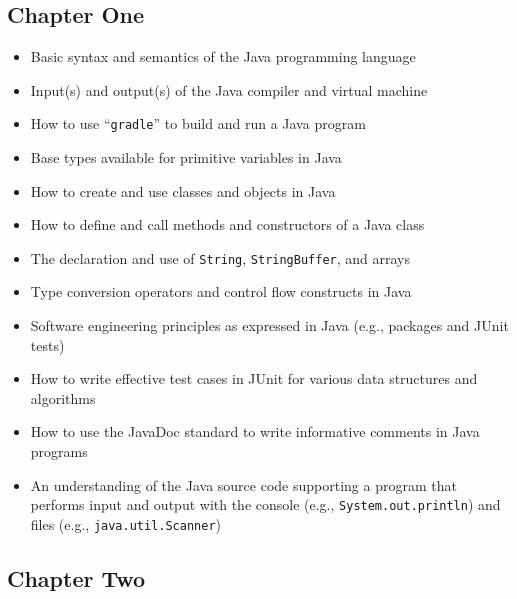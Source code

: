 \documentclass[11pt]{article}
\newcommand{\command}[1]{``\lstinline{#1}''}
\newcommand{\program}[1]{\lstinline{#1}}
\begin{document}
\subsection*{Chapter One}

\begin{itemize}

  \item Basic syntax and semantics of the Java programming language
  \item Input(s) and output(s) of the Java compiler and virtual machine
  \item How to use \command{gradle} to build and run a Java program
  \item Base types available for primitive variables in Java
  \item How to create and use classes and objects in Java
  \item How to define and call methods and constructors of a Java class
  \item The declaration and use of \program{String}, \program{StringBuffer}, and arrays
  \item Type conversion operators and control flow constructs in Java
  \item Software engineering principles as expressed in Java (e.g., packages and
    JUnit tests)
  \item How to write effective test cases in JUnit for various data structures
    and algorithms
  \item How to use the JavaDoc standard to write informative
    comments in Java programs
  \item An understanding of the Java source code supporting a program that
    performs input and output with the console (e.g.,
    \program{System.out.println}) and files (e.g., \program{java.util.Scanner})

\end{itemize}

\vspace*{-.2in}
\subsection*{Chapter Two}
\end{document}
